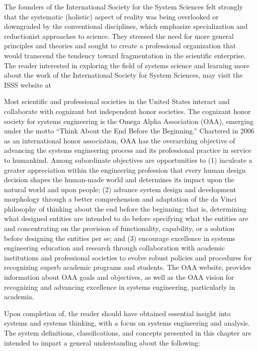 The founders of the International Society for the System Sciences felt strongly that the systematic (holistic) aspect of reality was being overlooked or downgraded by the conventional disciplines, which emphasize specialization and reductionist approaches to science. They stressed the need for more general principles and theories and sought to create a professional organization that would transcend the tendency toward fragmentation in the scientific enterprise. The reader interested in exploring the field of systems science and learning more about the work of the International Society for System Sciences, may visit the ISSS website at

Most scientific and professional societies in the United States interact and collaborate with cognizant but independent honor societies. The cognizant honor society for systems engineering is the Omega Alpha Association (OAA), emerging under the motto “Think About the End Before the Beginning.” Chartered in 2006 as an international honor association, OAA has the overarching objective of advancing the systems engineering process and its professional practice in service to humankind. Among subordinate objectives are opportunities to (1) inculcate a greater appreciation within the engineering profession that every human design decision shapes the human-made world and determines its impact upon the natural world and upon people; (2) advance system design and development morphology through a better comprehension and adaptation of the da Vinci philosophy of thinking about the end before the beginning; that is, determining what designed entities are intended to do before specifying what the entities are and concentrating on the provision of functionality, capability, or a solution before designing the entities per se; and (3) encourage excellence in systems engineering education and research through collaboration with academic institutions and professional societies to evolve robust policies and procedures for recognizing superb academic programs and students. The OAA website, provides information about OAA goals and objectives, as well as the OAA vision for recognizing and advancing excellence in systems engineering, particularly in academia.

Upon completion of, the reader should have obtained essential insight into systems and systems thinking, with a focus on systems engineering and analysis. The system definitions, classifications, and concepts presented in this chapter are intended to impart a general understanding about the following:

